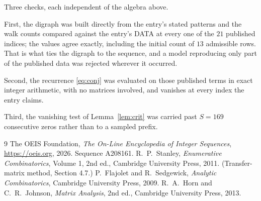 \documentclass[11pt,a4paper]{article}
\theoremstyle{plain}
\theoremstyle{definition}
\begin{document}
Three checks, each independent of the algebra above.

First, the digraph was built directly from the entry's stated patterns and the walk counts
compared against the entry's DATA at every one of the $21$ published indices; the
values agree exactly, including the initial count of $13$ admissible rows. That is
what ties the digraph to the sequence, and a model reproducing only part of the published
data was rejected wherever it occurred.

Second, the recurrence \eqref{eq:conj} was evaluated on those published terms in exact
integer arithmetic, with no matrices involved, and vanishes at every index the entry claims.

Third, the vanishing test of Lemma~\ref{lem:crit} was carried past $S=169$ consecutive
zeros rather than to a sampled prefix.

\begin{thebibliography}{9}
 The OEIS Foundation, \emph{The On-Line Encyclopedia of Integer
Sequences}, \url{https://oeis.org}, 2026. Sequence A208161.
 R.~P.~Stanley, \emph{Enumerative Combinatorics}, Volume 1, 2nd ed.,
Cambridge University Press, 2011. (Transfer-matrix method, Section 4.7.)
 P.~Flajolet and R.~Sedgewick, \emph{Analytic Combinatorics}, Cambridge
University Press, 2009.
 R.~A.~Horn and C.~R.~Johnson, \emph{Matrix Analysis}, 2nd ed., Cambridge
University Press, 2013.
\end{thebibliography}
\end{document}
